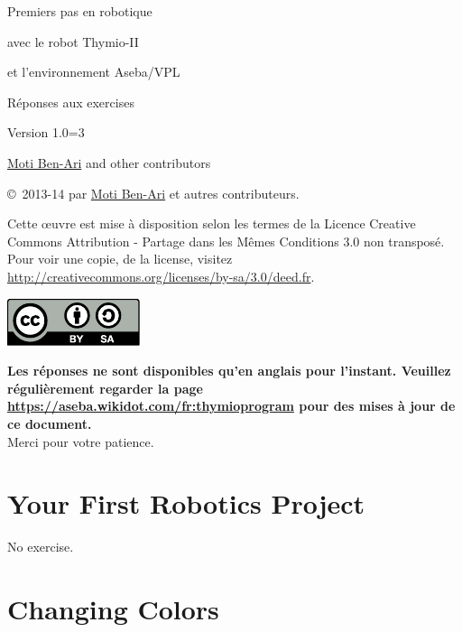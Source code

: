 \documentclass[12pt,a4paper,english]{article}
\begin{document}
\thispagestyle{empty}

\begin{center}
\begin{bfseries}

\begin{Large}
Premiers pas en robotique

avec le robot
Thymio-II

et l'environnement
Aseba/VPL

\bigskip

Réponses aux exercises

\end{Large}

Version 1.0=3

\bigskip

\href{http://www.weizmann.ac.il/sci-tea/benari/}{Moti Ben-Ari} and other contributors

\end{bfseries}
\end{center}

\bigskip

\copyright{}\  2013-14 par \href{http://www.weizmann.ac.il/sci-tea/benari/}{Moti Ben-Ari} et autres contributeurs.

Cette œuvre est mise à disposition selon les termes de la Licence Creative Commons Attribution - Partage dans les Mêmes Conditions 3.0 non transposé.
Pour voir une copie, de la license, visitez \url{http://creativecommons.org/licenses/by-sa/3.0/deed.fr}.

\begin{center}
\hspace{6pt}\includegraphics[width=.2\textwidth]{../images/by-sa}
\end{center}

\textbf{Les réponses ne sont disponibles qu'en anglais pour l'instant.
Veuillez régulièrement regarder la page \url{https://aseba.wikidot.com/fr:thymioprogram} pour des mises à jour de ce document.}\\
Merci pour votre patience.

\section{Your First Robotics Project}

No exercise.

\section{Changing Colors}
\end{document}
